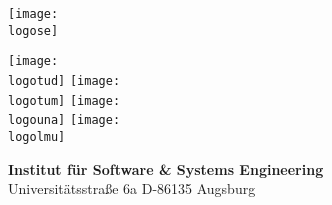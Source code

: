 \documentclass[\myrootdir/main.tex]{subfiles}
\begin{document}
\begin{titlepage}
\centering

\texttt{[image: \\logose]}

\vspace{1cm}

{\Large \myThesisType}

\vfill

\begin{spacing}{1.1}
\Huge \bfseries \myTitle
\end{spacing}

\vspace{1.5em}

{\Large \myAuthor}

\vfill

\texttt{[image: \\logotud]} \hspace{1cm}
\texttt{[image: \\logotum]} \hspace{1cm}
\texttt{[image: \\logouna]} \hspace{1cm}
\texttt{[image: \\logolmu]}

\vspace{8mm}
{\Large
{\bfseries Institut für Software \& Systems Engineering}\\
Universitätsstraße 6a \hspace{0.25cm} D-86135 Augsburg\\
}

\cleardoublepage
\end{titlepage}
\end{document}
